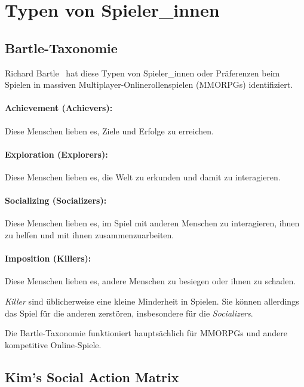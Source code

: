 \section{Typen von Spieler\_innen}
\label{spielertypen}

\subsection{Bartle-Taxonomie}
\label{bartle-taxonomie}

Richard Bartle~\cite{bartle-taxonomy} hat diese Typen von Spieler\_innen oder Präferenzen beim Spielen in massiven Multiplayer-Onlinerollenspielen (MMORPGs) identifiziert.

\paragraph{Achievement (Achievers):} Diese Menschen lieben es, Ziele und Erfolge zu erreichen.

\paragraph{Exploration (Explorers):} Diese Menschen lieben es, die Welt zu erkunden und damit zu interagieren.

\paragraph{Socializing (Socializers):} Diese Menschen lieben es, im Spiel mit anderen Menschen zu interagieren, ihnen zu helfen und mit ihnen zusammenzuarbeiten.

\paragraph{Imposition (Killers):} Diese Menschen lieben es, andere Menschen zu besiegen oder ihnen zu schaden.

\emph{Killer} sind üblicherweise eine kleine Minderheit in Spielen. Sie können allerdings das Spiel für die anderen zerstören, insbesondere für die \emph{Socializers}.

Die Bartle-Taxonomie funktioniert hauptsächlich für MMORPGs und andere kompetitive Online-Spiele.

\subsection{Kim’s Social Action Matrix}
\label{kims-social-action-matrix}

